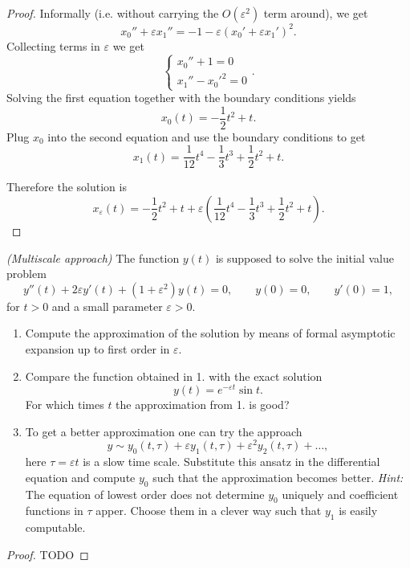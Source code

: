 \begin{proof}
  Informally (i.e. without carrying the $O(\varepsilon^2)$ term around), we get
  \[
    x_0'' + \varepsilon x_1'' = -1 - \varepsilon( x_0' + \varepsilon x_1')^2.
  \]
  Collecting terms in $\varepsilon$ we get
  \[
    \begin{cases}
      x_0'' + 1 = 0 \\
      x_1'' - x_0'^2 = 0
    \end{cases}.
  \]
  Solving the first equation together with the boundary conditions yields
  \[
    x_0(t) = - \frac{1}{2} t^2 + t.
  \]
  Plug $x_0$ into the second equation and use the boundary conditions to get
  \[
    x_1(t) = \frac{1}{12} t^4 - \frac{1}{3} t^3 + \frac{1}{2} t^2 + t.
  \]

  Therefore the solution is
  \[
    x_\varepsilon(t) = - \frac{1}{2} t^2 + t
    + \varepsilon \left(\frac{1}{12} t^4 - \frac{1}{3} t^3 + \frac{1}{2} t^2 + t \right).
  \]
\end{proof}

\begin{ex}
  [1.10]

  \textit{(Multiscale approach)} The function $y(t)$ is supposed to solve the initial value problem
  \[
    y''(t) + 2 \varepsilon y'(t) + (1 + \varepsilon^2)y(t) = 0,\qquad
    y(0) = 0,\qquad
    y'(0) = 1,
  \]
  for $t > 0$ and a small parameter $\varepsilon > 0$.
  \begin{enumerate}
    \item Compute the approximation of the solution by means of formal
      asymptotic expansion up to first order in $\varepsilon$.
    \item Compare the function obtained in 1. with the exact solution
      \[
        y(t) = e^{-\varepsilon t} \sin t.
      \]
      For which times $t$ the approximation from 1. is good?
    \item To get a better approximation one can try the approach
      \[
        y \sim y_0(t, \tau) + \varepsilon y_1(t, \tau) + \varepsilon^2 y_2(t, \tau) + \dots,
      \]
      here $\tau = \varepsilon t$ is a slow time scale.
      Substitute this ansatz in the differential equation and compute $y_0$
      such that the approximation becomes better.
      \textit{Hint:} The equation of lowest order does not determine $y_0$
      uniquely and coefficient functions in $\tau$ apper. Choose them in a
      clever way such that $y_1$ is easily computable.
  \end{enumerate}
\end{ex}


\begin{proof}
  TODO
\end{proof}

